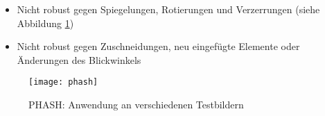 \begin{itemize}[topsep=0pt]
    \item Nicht robust gegen Spiegelungen, Rotierungen und Verzerrungen (siehe
    Abbildung \ref{fig:phash})
    \item Nicht robust gegen Zuschneidungen, neu eingefügte Elemente oder
    Änderungen des Blickwinkels
\end{itemize}

\begin{figure}[H]
    \centering
    \texttt{[image: phash]}
    \caption{PHASH: Anwendung an verschiedenen Testbildern}
    \label{fig:phash}
\end{figure}